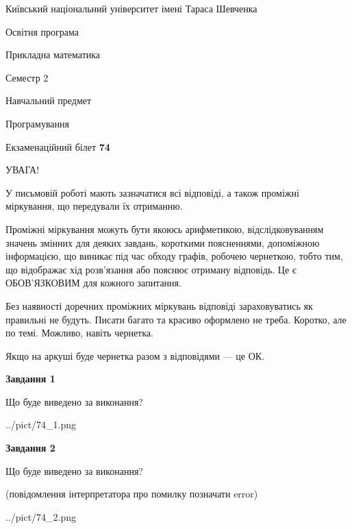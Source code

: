 \documentclass[12pt, ukrainian]{article}
\begin{document}
{{\begin {small}\par
{ \center  Київський національний університет імені Тараса Шевченка \par}
{\parbox {5 cm}{Освітня програма \hfill}{\parbox {7 cm}{Прикладна математика\hfill}}\parbox {6 cm}{\hfill Семестр 2}}\par
{\parbox {5 cm} {Навчальний предмет \hfill}\parbox {7 cm}{Програмування \hfill}\parbox {6cm}{\hfill}\par}\vspace{-7pt} \end{small}}{\center Екзаменаційний білет \No \textbf
{ 74 }\par}}
{
\begin {large}
УВАГА!

У письмовій роботі мають зазначатися всі відповіді, а також проміжні міркування, що передували їх отриманню.

Проміжні міркування можуть бути якоюсь арифметикою, відслідковуванням зна\-чень змінних для деяких завдань,
короткими поясненнями, допоміжною інформацією, що виникає під час обходу графів, робочею чернеткою,
тобто тим, що відображає хід розв’язання або пояснює отриману відповідь.
Це є ОБОВ’ЯЗКОВИМ для кожного запитання.

Без наявності доречних проміжних міркувань відповіді зараховуватись як правиль\-ні не будуть.
Писати багато та красиво оформлено не треба. Коротко, але по темі. Можли\-во, навіть чернетка.

Якщо на аркуші буде чернетка разом з відповідями --- це ОК.

\newpage

{\begin {center}\textbf{Завдання 1}\end {center}}\par
Що буде виведено за виконання?\par
\begin{center}
	{../pict/74_1.png}
\end{center}
\newpage

{\begin {center}\textbf{Завдання 2}\end {center}}\par
Що буде виведено за виконання?\par
 (повідомлення інтерпретатора про помилку позначати error)\par
\begin{center}
	{../pict/74_2.png}
\end{center}
\newpage


\end{large}}
\end{document}
